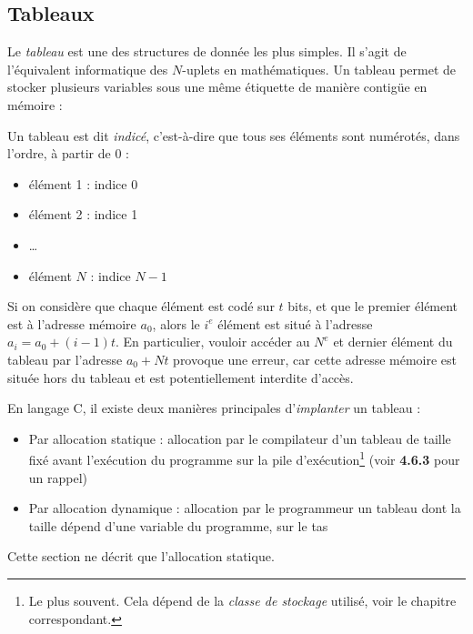 \documentclass[../../../main.tex]{subfiles}
\begin{document}
\subsection{Tableaux}
\label{sub:tableaux}
 
Le \textit{tableau} est une des structures de donnée les plus simples. Il s'agit de l'équivalent informatique des $N$-uplets en mathématiques. Un tableau permet de stocker plusieurs variables sous une même étiquette de manière contigüe en mémoire : 

\begin{minipage}{\textwidth}
	\begin{center}
		
	\end{center}
\end{minipage} 

Un tableau est dit \textit{indicé}, c'est-à-dire que tous ses éléments sont numérotés, dans l'ordre, à partir de 0 :
\begin{itemize}
	\item élément 1 : indice 0
	\item élément 2 : indice 1
	\item \dots
	\item élément $N$ : indice $N - 1$
\end{itemize}
Si on considère que chaque élément est codé sur $t$ bits, et que le premier élément est à l'adresse mémoire $a_{0}$, alors le $i^e$ élément est situé à l'adresse $a_{i} = a_{0} + (i - 1)t$. En particulier, vouloir accéder au $N^e$ et dernier élément du tableau par l'adresse $a_{0} + Nt$ provoque une erreur, car cette adresse mémoire est située hors du tableau et est potentiellement interdite d'accès.
 
\begin{minipage}{\textwidth}
	\begin{center}
		
	\end{center}
\end{minipage}
 
En langage C, il existe deux manières principales d'\textit{implanter} un tableau :
\begin{itemize}
	\item Par allocation statique : allocation par le compilateur d'un tableau de taille fixé avant l'exécution du programme sur la pile d'exécution\footnote{Le plus souvent. Cela dépend de la \textit{classe de stockage} utilisé, voir le chapitre correspondant.} (voir \textbf{4.6.3} pour un rappel)
	\item Par allocation dynamique : allocation par le programmeur un tableau dont la taille dépend d'une variable du programme, sur le tas
\end{itemize}
Cette section ne décrit que l'allocation statique.
\end{document}
